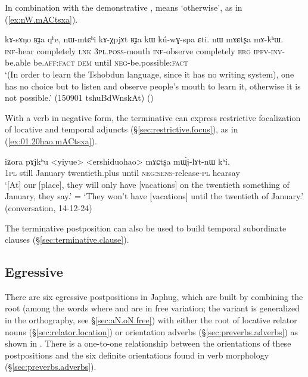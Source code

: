 In combination with the demonstrative ,  means `otherwise', as in (\ref{ex:nW.mACtsxa}).

\begin{exe}
\ex \label{ex:nW.mACtsxa}
 \gll   kɤ-sɤŋo ʁɟa qʰe,  nɯ-mtɕʰi kɤ-χpjɤt ʁɟa kɯ kú-wɣ-spa ɕti.  nɯ mɤɕtʂa mɤ-kʰɯ. \\
 \textsc{inf}-hear completely \textsc{lnk} \textsc{3pl}.\textsc{poss}-mouth \textsc{inf}-observe completely \textsc{erg} \textsc{ipfv}-\textsc{inv}-be.able be.\textsc{aff}:\textsc{fact} \textsc{dem} until \textsc{neg}-be.possible:\textsc{fact} \\
\glt `(In order to learn the Tshobdun language, since it has no writing system), one has no choice but to listen and observe people's mouth to learn it, otherwise it is not possible.' (150901 tshuBdWnskAt)
()
\end{exe}

With a verb in negative form, the terminative can express restrictive focalization of locative and temporal adjuncts (§\ref{sec:restrictive.focus}), as in (\ref{ex:01.20hao.mACtsxa}).

\begin{exe}
\ex \label{ex:01.20hao.mACtsxa}
 \gll  iʑora pɤjkʰu <yiyue> <ershiduohao> mɤɕtʂa mɯ́j-lɤt-nɯ kʰi. \\
 \textsc{1pl} still January twentieth.plus until \textsc{neg}:\textsc{sens}-release-\textsc{pl} hearsay \\
 \glt `[At] our [place], they will only have [vacations] on the twentieth something of January, they say.' = `They won't have [vacations] until the twentieth of January.' (conversation, 14-12-24)
 \end{exe}
 
The terminative postposition  can also be used to build temporal subordinate clauses (§\ref{sec:terminative.clause}).

\subsection{Egressive} \label{sec:egressive}  
There are six egressive postpositions in Japhug, which are built by combining the root  (among the words where  and  are in free variation; the variant  is generalized in the orthography,  see §\ref{sec:aN.oN.free}) with either the root of locative relator nouns (§\ref{sec:relator.location}) or orientation adverbs (§\ref{sec:preverbs.adverbs}) as shown in . There is a one-to-one relationship between the orientations of these postpositions and the six definite orientations found in verb morphology (§\ref{sec:preverbs.adverbs}).

